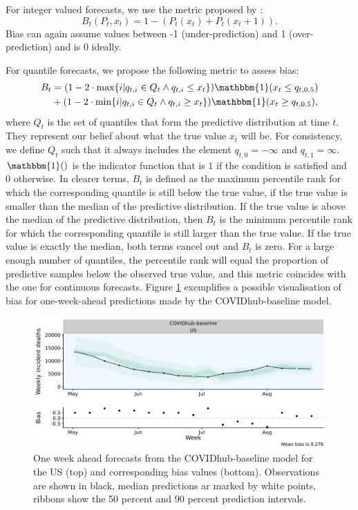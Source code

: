 \documentclass[
]{book}
\renewcommand{\mathbb}{\mathbbm}
\begin{document}
For integer valued forecasts, we use the metric proposed by \citet{funkAssessingPerformanceRealtime2019}:
\[B_t (P_t, x_t) = 1 - (P_t (x_t) + P_t (x_t + 1)).\]
Bias can again assume values between -1 (under-prediction) and 1 (over-prediction) and is 0 ideally.

For quantile forecasts, we propose the following metric to assess bias:
\begin{align*}
  B_t &= (1 - 2 \cdot \max \{i | q_{t,i} \in Q_t \land q_{t,i} \leq x_t\}) \mathbb{1}( x_t \leq q_{t, 0.5}) \\
  &+ (1 - 2 \cdot \min \{i | q_{t,i} \in Q_t \land q_{t,i} \geq x_t\}) \mathbb{1}( x_t \geq q_{t, 0.5}),
\end{align*}
where \(Q_t\) is the set of quantiles that form the predictive distribution at time \(t\). They represent our belief about what the true value \(x_t\) will be. For consistency, we define \(Q_t\) such that it always includes the element \(q_{t, 0} = - \infty\) and \(q_{t,1} = \infty\). \(\mathbb{1}()\) is the indicator function that is \(1\) if the condition is satisfied and \(0\) otherwise. In clearer terms, \(B_t\) is defined as the maximum percentile rank for which the corresponding quantile is still below the true value, if the true value is smaller than the median of the predictive distribution. If the true value is above the median of the predictive distribution, then \(B_t\) is the minimum percentile rank for which the corresponding quantile is still larger than the true value. If the true value is exactly the median, both terms cancel out and \(B_t\) is zero. For a large enough number of quantiles, the percentile rank will equal the proportion of predictive samples below the observed true value, and this metric coincides with the one for continuous forecasts. Figure \ref{fig:bias-example} exemplifies a possible visualisation of bias for one-week-ahead predictions made by the COVIDhub-baseline model.

\begin{figure}
\includegraphics[width=1\linewidth]{../visualisation/chapter-3-evaluation/bias_example} \caption{One week ahead forecasts from the COVIDhub-baseline model for the US (top) and corresponding bias values (bottom). Observations are shown in black, median predictions ar marked by white points, ribbons show the 50 percent and 90 percent prediction intervals.}\label{fig:bias-example}
\end{figure}
\end{document}
